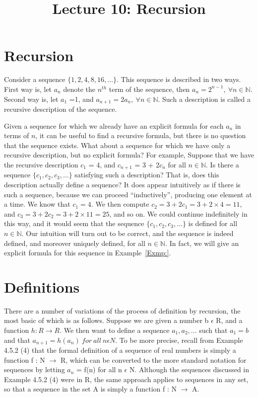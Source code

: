 \documentclass[a4paper,english,12pt]{article}
\title{Lecture 10: Recursion}
\author{}
\begin{document}
\maketitle
\section{Recursion}
Consider a sequence $\{1, 2, 4, 8, 16, \ldots\}$. This sequence is described in two ways. First way is, let $a_n$ denote the $n^{th}$ term of the sequence, then $a_n=2^{n-1},~ \forall n\in \mathbb{N}$. Second way is, let $a_1$ =1, and $a_{n+1}=2a_n,~ \forall n\in \mathbb{N}$. Such a description is called a recursive description of the sequence.

Given a sequence for which we already have an explicit formula for each $a_n$ in terms of $n$, it can be useful to find a recursive formula, but there is no question that the sequence exists. What about a sequence for which we have only a recursive description, but no explicit formula?
For example, Suppose that we have the recursive description $c_1$ = 4, and $c_{n+1}$ = 3 + 2$c_n$ for all $n \in \mathbb{N}$. Is there a sequence $\{c_1, c_2, c_3, \ldots \}$ satisfying such a description? That is, does this description actually define a sequence? It does appear intuitively as if there is such a sequence, because we can proceed “inductively”, producing one element at a time. We know that $c_1 = 4$. We then compute $c_2 = 3 + 2 c_1 = 3 + 2 \times 4 = 11$, and $c_3 = 3 + 2c_2 = 3 + 2 \times 11 = 25$, and so on. We could continue indefinitely in this way, and it would seem that the sequence $\{c_1, c_2, c_3, \ldots \}$ is defined for all $n \in \mathbb{N}$. Our intuition will turn out to be correct, and the sequence is indeed defined, and moreover uniquely defined, for all $n \in \mathbb{N}$. In fact, we will give an explicit formula for this sequence in Example~\ref{Exmp:}.

\section{Definitions}
There are a number of variations of the process of definition by recursion, the most basic of which is as follows. Suppose we are given a number b $\epsilon$ R, and a function $h:R\rightarrow R$. We then want to define a sequence $a_1,a_2, ...$ such that $a_1=b$ and that $a_{n+1}=h(a_n)~for ~all~  n \epsilon N$. To be more precise, recall from Example 4.5.2 (4) that the formal definition of a sequence of real numbers is simply a function f : N $\rightarrow$ R, which can be converted to the more standard notation for sequences by letting $a_n$ = f(n) for all n $\epsilon$ N. Although the sequences discussed in Example 4.5.2 (4) were in R, the same approach applies to sequences in any set, so that a sequence in the set A is simply a function f : N $\rightarrow$ A.
\end{document}
